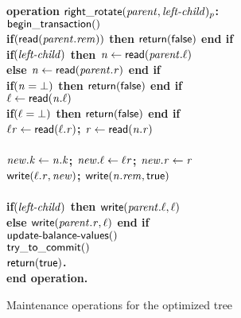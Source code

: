 \begin{figure}[h!]
{{\begin{minipage}[t]{150mm}
\begin{tabbing}
		
		
\bf{operation} $\act{right\_rotate}(\ms{parent}, \ms{left-child})_p$: \\
		 \> $\lit{begin\_transaction}()$ \\
		 \> \bf{if}$(\lit{read}(\ms{parent.rem}))$ \bf{then} $\sf{return}(\lit{false})$ \bf{end if}\\%
		 \> \bf{if}$(\ms{left-child})$ \bf{then} $\ms{n} \gets \lit{read}(\ms{parent.\ell})$ \\
		 \>\> \bf{else} $\ms{n} \gets \lit{read}(\ms{parent.r})$ {\bf end if} \\
		 \> \bf{if}$(\ms{n = \bot})$ \bf{then} $\sf{return}(\lit{false})$ \bf{end if} \\
		 \> $\ms{\ell} \gets \lit{read}(\ms{n.\ell})$ \\
		 \> \bf{if}$(\ms{\ell = \bot})$ \bf{then} $\sf{return}(\lit{false})$ \bf{end if} \\%
		 \> $\ms{\ell{}r} \gets \lit{read}(\ms{\ell.r})$; $\ms{r} \gets \lit{read}(\ms{n.r})$ \\
		 \>  \\%
		 \> $\ms{new.k} \gets \ms{n.k}$; $\ms{new.\ell} \gets \ms{\ell{}r}$; $\ms{new.r} \gets \ms{r}$ \\%
		 \> $\lit{write}(\ms{\ell.r}, \ms{new})$; $\lit{write}(\ms{n.rem}, \lit{true})$ \\%
		 \>  \\
		 \> \bf{if}$(\ms{left-child})$ \bf{then} $\lit{write}(\ms{parent.\ell}, \ms{\ell})$ \\%
		 \> \bf{else} $\lit{write}(\ms{parent.r}, \ms{\ell})$ \bf{end if} \\%
		 \> $\act{update-balance-values()}$ \\%
		 \> $\lit{try\_to\_commit}()$ \\
		 \> $\sf{return}(\lit{true})$. \\
		{\bf end operation}. 
		

\end{tabbing}
\normalsize
\end{minipage}
}
\caption{Maintenance operations for the optimized tree}
\label{fig:tree-opt-maintenance}
}
\end{figure}
